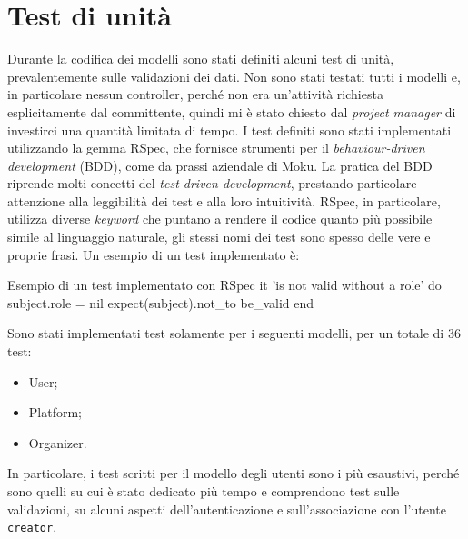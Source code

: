 \section{Test di unità} \label{code:spec}
Durante la codifica dei modelli sono stati definiti alcuni test di unità, prevalentemente sulle validazioni dei dati. Non sono stati testati tutti i modelli e, in particolare nessun controller, perché non era un'attività richiesta esplicitamente dal committente, quindi mi è stato chiesto dal \emph{project manager} di investirci una quantità limitata di tempo. I test definiti sono stati implementati utilizzando la gemma RSpec, che fornisce strumenti per il \emph{behaviour-driven development} (BDD), come da prassi aziendale di Moku. La pratica del BDD riprende molti concetti del \emph{test-driven development}, prestando particolare attenzione alla leggibilità dei test e alla loro intuitività. RSpec, in particolare, utilizza diverse \emph{keyword} che puntano a rendere il codice quanto più possibile simile al linguaggio naturale, gli stessi nomi dei test sono spesso delle vere e proprie frasi.
Un esempio di un test implementato è:

\begin{code}{Esempio di un test implementato con RSpec}
it 'is not valid without a role' do
  subject.role = nil
  expect(subject).not_to be_valid
end
\end{code}

\noindent Sono stati implementati test solamente per i seguenti modelli, per un totale di 36 test:
\begin{itemize}
	\item User;
	\item Platform;
	\item Organizer.
\end{itemize}
In particolare, i test scritti per il modello degli utenti sono i più esaustivi, perché sono quelli su cui è stato dedicato più tempo e comprendono test sulle validazioni, su alcuni aspetti dell'autenticazione e sull'associazione con l'utente \verb|creator|.
